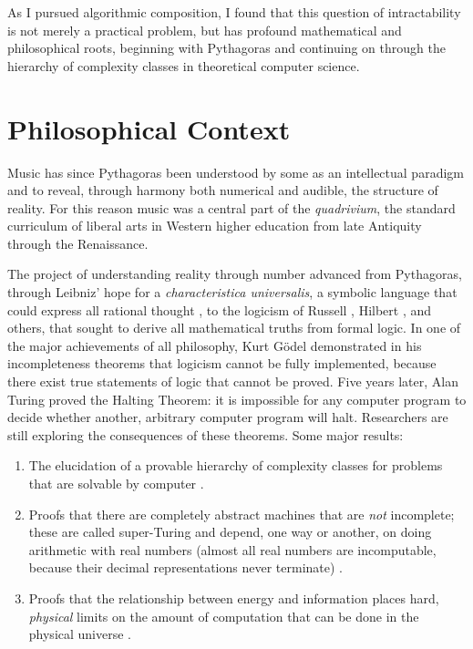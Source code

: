 \documentclass[11pt,papersize=a4]{scrartcl}
\begin{document}
As I pursued algorithmic composition, I found that this question of intractability is not merely a practical problem, but has profound mathematical and philosophical roots, beginning with Pythagoras and continuing on through the hierarchy of complexity classes in theoretical computer science. 

\section*{Philosophical Context}

Music has since Pythagoras \parencite{sep-pythagoras, huffman2014history} been understood by some as an intellectual paradigm and to reveal, through harmony both numerical and audible, the structure of reality. For this reason music was a central part of the \emph{quadrivium}, the standard curriculum of liberal arts in Western higher education from late Antiquity through the Renaissance.

The project of understanding reality through number advanced from Pythagoras, through Leibniz' 
hope for a \emph{characteristica universalis}, a symbolic language that could express all rational thought \parencite{davis2018universal}, to the logicism of Russell \parencite{sep-logicism}, Hilbert \parencite{sep-hilbert-program}, and others, that sought to derive all mathematical truths from formal logic. In one of the major achievements of all philosophy, Kurt Gödel \parencite{godel1986} demonstrated in his incompleteness theorems that logicism cannot be fully implemented, because there exist true statements of logic that cannot  be proved. Five years later, Alan Turing proved the Halting Theorem: it is impossible for any computer program to decide whether another, arbitrary computer program will halt. Researchers are still exploring the consequences of these theorems. Some major results:

\begin{enumerate}
\item The elucidation of a provable hierarchy of complexity classes for problems that are solvable by computer \parencite{arora2009computational}.
\item Proofs that there are completely abstract machines that are \emph{not} incomplete; these are called super-Turing and depend, one way or another, on doing arithmetic with real numbers (almost all real numbers are incomputable, because their decimal representations never terminate) \parencite{ord2006many}.
\item Proofs that the relationship between energy and information places hard, \emph{physical} limits on the amount of computation that can be done in the physical universe \parencite{aaronson2005npcomplete, sep-computation-physicalsystems}.
\end{enumerate}
\end{document}
